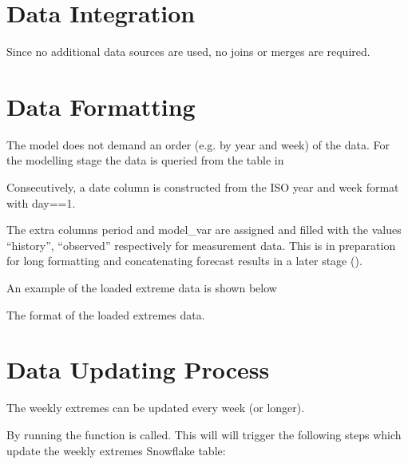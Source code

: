 \documentclass[letterpaper,10pt,english]{sphinxmanual}
\let\sphinxpxdimen\pdfpxdimen\else\newdimen\sphinxpxdimen
\begin{document}
\section{Data Integration}
\label{\detokenize{data_preparation:data-integration}}
Since no additional data sources are used, no joins or merges are required.


\section{Data Formatting}
\label{\detokenize{data_preparation:data-formatting}}
The model does not demand an order (e.g. by year and week) of the data.
For the modelling stage the data is queried from the table in {\hyperref[\detokenize{data_preparation:data-construction}]{}}

Consecutively, a date column is constructed from the ISO year and week format with day==1.

The extra columns period and model\_var are assigned and filled with the values “history”, “observed” respectively for measurement data.
This is in preparation for long formatting and concatenating forecast results in a later stage ({\hyperref[\detokenize{autoapi/src/preprocess/preprocess/index:src.preprocess.preprocess.format_data}]{}}).

An example of the loaded extreme data is shown below

\noindent{\hspace*{\fill}\sphinxincludegraphics[width=800\sphinxpxdimen]{{loaded_extremes}.png}\hspace*{\fill}}

The format of the loaded extremes data.


\section{Data Updating Process}
\label{\detokenize{data_preparation:data-updating-process}}
The weekly extremes can be updated every week (or longer).

By running {\hyperref[\detokenize{autoapi/src/preprocess/update_extremes/index:module-src.preprocess.update_extremes}]{}} the function {\hyperref[\detokenize{autoapi/src/utils/snowflake/index:src.utils.snowflake.update_week_extremes}]{}} is called.
This will will trigger the following steps which update the weekly extremes Snowflake table:
\end{document}

